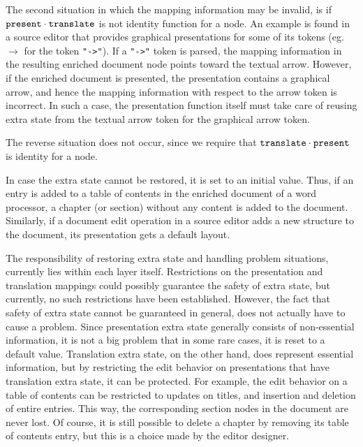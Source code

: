 The second situation in which the mapping information may be invalid, is if 
${\tt present} \cdot {\tt translate}$ is not identity function for a node.  An example is found in a source editor that provides graphical presentations for some of its tokens (eg. $\rightarrow$ for the token \verb|"->"|). If a \verb|"->"| token is parsed, the mapping information in the resulting enriched document node points toward the textual arrow. However, if the enriched document is presented, the presentation contains a graphical arrow, and hence the mapping information with respect to the arrow token is incorrect. In such a case, the presentation function itself must take care of reusing extra state from the textual arrow token for the graphical arrow token.

The reverse situation does not occur, since we require that ${\tt translate} \cdot {\tt present}$ is identity for a node. 

In case the extra state cannot be restored, it is set to an initial value. Thus, if an entry is added to a table of contents in the enriched document of a word processor, a chapter (or section) without any content is added to the document. Similarly, if a document edit operation in a source editor adds a new structure to the document, its presentation gets a default layout.

The responsibility of restoring extra state and handling problem situations, currently lies within each layer itself. Restrictions on the presentation and translation mappings could possibly guarantee the safety of extra state, but currently, no such restrictions have been established. However, the fact that safety of extra state cannot be guaranteed in general, does not actually have to cause a problem. Since presentation extra state generally consists of non-essential information, it is not a big problem that in some rare cases, it is reset to a default value.  Translation extra state, on the other hand, does represent essential information, but by restricting the edit behavior on presentations that have translation extra state, it can be protected. For example, the edit behavior on a table of contents can be restricted to updates on titles, and insertion and deletion of entire entries. This way, the corresponding section nodes in the document are never lost. Of course, it is still possible to delete a chapter by removing its table of contents entry, but this is a choice made by the editor designer. 


